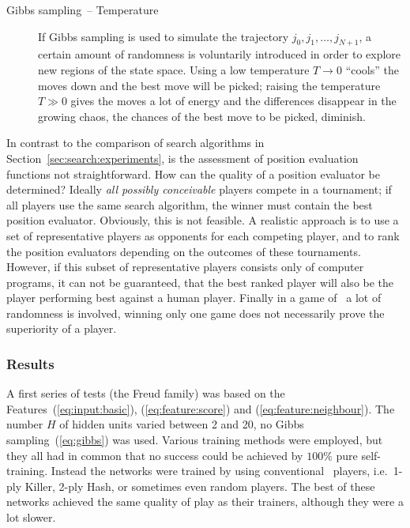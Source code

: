 \begin{description}
\item[Gibbs sampling~-- Temperature]
If Gibbs sampling is used to simulate the trajectory $j_0,j_1, \ldots, j_{N+1}$, a certain amount of randomness is voluntarily introduced in order to explore new regions of the state space. Using a low temperature $T \rightarrow 0$ ``cools'' the moves down and the best move will be picked; raising the temperature $T \gg 0$ gives the moves a lot of energy and the differences disappear in the growing chaos, the chances of the best move to be picked, diminish.

\end{description}

In contrast to the comparison of search algorithms in Section~\ref{sec:search:experiments}, is the assessment of position evaluation functions not straightforward. How can the quality of a position evaluator be determined? Ideally \emph{all possibly conceivable} players compete in a tournament; if all players use the same search algorithm, the winner must contain the best position evaluator. Obviously, this is not feasible. A realistic approach is to use a set of representative players as opponents for each competing player, and to rank the position evaluators depending on the outcomes of these tournaments. However, if this subset of representative players consists only of computer programs, it can not be guaranteed, that the best ranked player will also be the player performing best against a human player. Finally in a game of \Abalone\ a lot of randomness is involved, winning only one game does not necessarily prove the superiority of a player.




\subsubsection*{Results} 
A first series of tests (the \textsf{Freud} family) was based on the Features~(\ref{eq:input:basic}), (\ref{eq:feature:score}) and (\ref{eq:feature:neighbour}). The number $H$ of hidden units varied between 2 and 20, no Gibbs sampling~(\ref{eq:gibbs}) was used. Various training methods were employed, but they all had in common that no success could be achieved by $100\%$ 
pure self-training. Instead the networks were trained by using conventional \Malin\ players, i.e.~1-ply Killer, 2-ply Hash, or sometimes even random players. The best of these networks achieved the same quality of play as their trainers, although they were a lot slower. 

